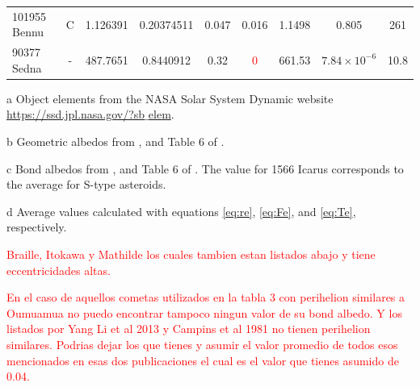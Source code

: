 \documentclass[a4paper,fleqn,usenatbib]{mnras}
\newcommand{\fix}{\textcolor{red}}
\begin{document}
\begin{table}
\begin{threeparttable}
\begin{tabular}{ l c c c c c c c c }
 101955	Bennu & C & 1.126391 & 0.20374511 & 0.047 & 0.016   & 1.1498 & 0.805 & 261 \\
 90377 Sedna & - & 487.7651 & 0.8440912 & 0.32 & \fix{0} & 661.53  & $7.84\times10^{-6}$ & 10.8 \\
 \hline
 \hline
\end{tabular}
\label{tab:elliptic}
	\begin{tablenotes}
	\small
\item[a]{Object elements from the NASA Solar System Dynamic website \href{https://ssd.jpl.nasa.gov/?sb$\_$elem}{https://ssd.jpl.nasa.gov/?sb$\_$elem}.}
\item[b] {Geometric albedos from \citet{2004come.book..223L,2015Sci...347a0628C,2012A&A...541L...6P,2015ApJ...814..117N,2015Icar..252..393T}, and Table 6 of \citet{2013Icar..226.1252L}.}
\item[c] {Bond albedos from \citet{1981motc.conf...83C,2004Icar..167..129B,2015Icar..252..393T}, and Table 6 of \citet{2013Icar..226.1252L}. The value for 1566 Icarus corresponds to the average for S-type asteroids.}
\item[d]{Average values calculated with equations \ref{eq:re}, \ref{eq:Fe}, and \ref{eq:Te}, respectively.}
	\end{tablenotes}
\end{threeparttable}
\end{table}

\fix{Braille, Itokawa y Mathilde los cuales tambien estan listados abajo y tiene eccentricidades altas.}

\fix{En el caso de aquellos cometas utilizados en la tabla 3 con perihelion similares a Oumuamua no puedo encontrar tampoco ningun valor de su bond albedo.  Y los listados por Yang Li et al 2013 y Campins et al 1981 no tienen perihelion similares.  Podrias dejar los que tienes y asumir el valor promedio de todos esos mencionados en esas dos publicaciones el cual es el valor que tienes asumido de 0.04.}


\end{document}
